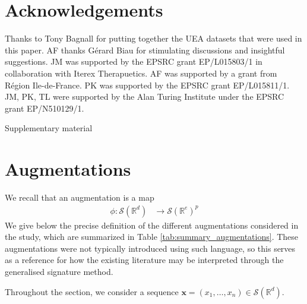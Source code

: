 \documentclass{article}
\theoremstyle{definition}
\theoremstyle{remark}
\newcommand{\reals}{\mathbb{R}}
\newcommand{\tseries}[1]{\mathcal{S}(#1)}
\begin{document}
	\section*{Acknowledgements}
	Thanks to Tony Bagnall for putting together the UEA datasets that were used in this paper. AF thanks G{\'e}rard Biau for stimulating discussions and insightful suggestions. JM was supported by the EPSRC grant EP/L015803/1 in collaboration with Iterex Therapuetics. AF was supported by a grant from R{\'e}gion Ile-de-France. PK was supported by the EPSRC grant EP/L015811/1. JM, PK, TL were supported by the Alan Turing Institute under the EPSRC grant EP/N510129/1.

	 


	\small
	 
	
	\normalsize
	\newpage
	\appendix
	\begin{center}
	\huge Supplementary material
	\end{center}

	\section{Augmentations}
	\label{sec:augmentations_details}

	We recall that an augmentation is a map
	\begin{align*}
	\phi \colon  \tseries{\reals^d} &\to \tseries{\reals^e}^p
	\end{align*}
	We give below the precise definition of the different augmentations considered in the study, which are summarized in Table \ref{tab:summary_augmentations}. These augmentations were not typically introduced using such language, so this serves as a reference for how the existing literature may be interpreted through the generalised signature method.	
	
	Throughout the section, we consider a sequence $\mathbf{x}=(x_1,\dots,x_n) \in \tseries{\reals^d}$.
\end{document}
